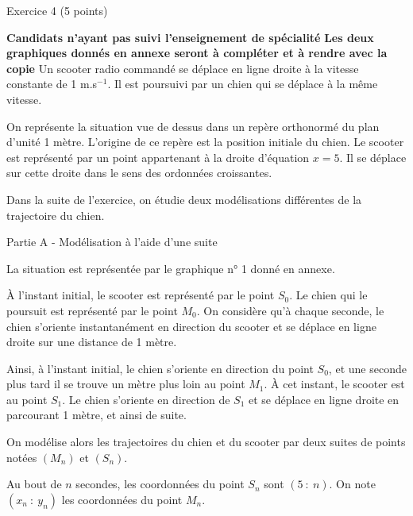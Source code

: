 
\begin{h2}Exercice 4 (5 points)\end{h2}
\textbf{Candidats n'ayant pas suivi l'enseignement de spécialité}
\medskip
\textbf{Les deux graphiques donnés en annexe seront à compléter et à rendre avec la copie}
\medskip
Un scooter radio commandé se déplace en ligne droite à la vitesse constante de 1 m.s$^{-1}$. Il est poursuivi
par un chien qui se déplace à la même vitesse.
\par
On représente la situation vue de dessus dans un repère orthonormé du plan d'unité 1 mètre. L'origine de ce repère est la position initiale du chien. Le scooter est représenté par un point appartenant à la droite d'équation $x = 5$. Il se déplace sur cette droite dans le sens des ordonnées croissantes.
\par
\smallskip
\par
Dans la suite de l'exercice, on étudie deux modélisations différentes de la trajectoire du chien.
\bigskip
\begin{center}\begin{h3}Partie A - Modélisation à l'aide d'une suite \end{h3}\end{center}
\medskip
La situation est représentée par le graphique n° 1 donné en annexe.
\par
À l'instant initial, le scooter est représenté par le point $S_0$. Le chien qui le poursuit est représenté
par le point $M_0$. On considère qu'à chaque seconde, le chien s'oriente instantanément en direction
du scooter et se déplace en ligne droite sur une distance de 1 mètre.
\par
Ainsi, à l'instant initial, le chien s'oriente en direction du point $S_0$, et une seconde plus tard il se
trouve un mètre plus loin au point $M_1$. À cet instant, le scooter est au point $S_1$. Le chien s'oriente
en direction de $S_1$ et se déplace en ligne droite en parcourant 1 mètre, et ainsi de suite.
\par
On modélise alors les trajectoires du chien et du scooter par deux suites de points notées $\left(M_n\right)$ et $\left(S_n\right)$.
\par
Au bout de $n$ secondes, les coordonnées du point $S_n$ sont $(5~:~n)$. On note $\left(x_n~:~y_n\right)$ les coordonnées du point $M_n$.
\medskip
